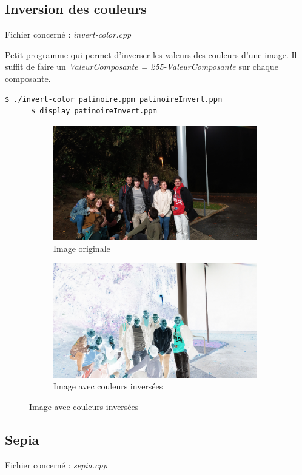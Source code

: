 \documentclass[a4paper,10pt]{article}
\begin{document}
    \subsection{Inversion des couleurs}
    Fichier concerné : \emph{invert-color.cpp}

    Petit programme qui permet d'inverser les valeurs des couleurs d'une image. Il suffit de faire un \emph{ValeurComposante = 255-ValeurComposante} sur chaque composante.
    \begin{lstlisting}[language=Bash]
      $ ./invert-color patinoire.ppm patinoireInvert.ppm       
      $ display patinoireInvert.ppm 
    \end{lstlisting}
    \begin{figure}[h]
      \begin{subfigure}{0.6\textwidth}
       \includegraphics[width=1\linewidth, height=5cm]{patinoire3}
       \caption{Image originale}
       \label{fig:patinoire}
       \end{subfigure}
        \begin{subfigure}{0.6\textwidth}
       \includegraphics[width=1\linewidth, height=5cm]{patinoire3Invert.jpeg}   
       \caption{Image avec couleurs inversées}
       \label{fig:patinoireInvert}
       \end{subfigure}
       \end{figure}
    \subsection{Sepia}
    Fichier concerné : \emph{sepia.cpp}
\end{document}
